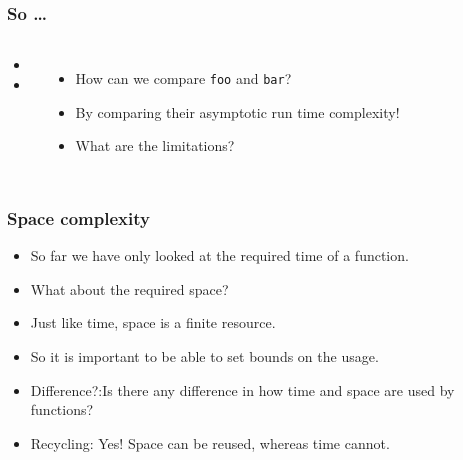 \begin{frame}
	\frametitle{So \ldots}

	\begin{columns}
	\begin{itemize}
		\item 
		
		\item 
	\end{itemize}	
		
	\begin{itemize}
		\item How can we compare \texttt{foo} and \texttt{bar}?
		\item By comparing their asymptotic run time complexity!
		\item What are the limitations?
	\end{itemize}	
		
	\end{columns}
\end{frame}

\begin{frame}
	\frametitle{Space complexity}
	\begin{itemize}
		\item So far we have only looked at the required \alert{time} of a function.
		\item What about the required \alert{space}?
			
		\item Just like time, space is a \alert{finite} resource.	
		\item So it is important to be able to set bounds on the usage.
	
		\item Difference?:Is there any difference in how time and space are used by functions?
		\item Recycling:	Yes! Space can be reused, whereas time cannot.
	\end{itemize}
\end{frame}

